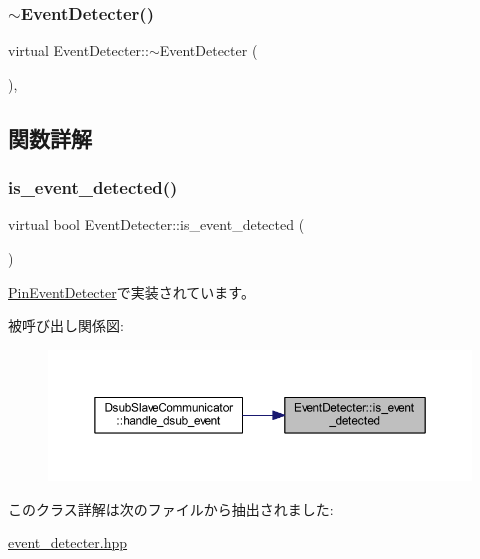\subsubsection{\texorpdfstring{$\sim$EventDetecter()}{~EventDetecter()}}
{\footnotesize\ttfamily virtual Event\+Detecter\+::$\sim$\+Event\+Detecter (\begin{DoxyParamCaption}{ }\end{DoxyParamCaption})\hspace{0.3cm}{\ttfamily [inline]}, {\ttfamily [virtual]}}



\subsection{関数詳解}
\mbox{\label{class_event_detecter_ae5f2c62e1226dcd9434eef3db92a8a70}} 
\subsubsection{\texorpdfstring{is\_event\_detected()}{is\_event\_detected()}}
{\footnotesize\ttfamily virtual bool Event\+Detecter\+::is\+\_\+event\+\_\+detected (\begin{DoxyParamCaption}{ }\end{DoxyParamCaption})\hspace{0.3cm}{\ttfamily [pure virtual]}}



\mbox{\hyperlink{class_pin_event_detecter_a6e65a11e39838c30f58c66dd057abc90}{Pin\+Event\+Detecter}}で実装されています。

被呼び出し関係図\+:
\nopagebreak
\begin{figure}[H]
\begin{center}
\leavevmode
\includegraphics[width=350pt]{class_event_detecter_ae5f2c62e1226dcd9434eef3db92a8a70_icgraph}
\end{center}
\end{figure}


このクラス詳解は次のファイルから抽出されました\+:\begin{DoxyCompactItemize}
\item 
\mbox{\hyperlink{event__detecter_8hpp}{event\+\_\+detecter.\+hpp}}\end{DoxyCompactItemize}
